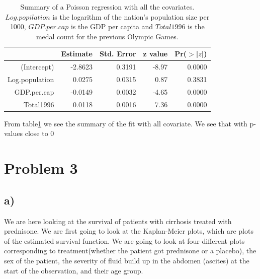 \documentclass[a4paper,norsk, 10pt]{article}
\begin{document}
\begin{table}[!htb]
\centering
\begin{tabular}{rrrrr}
  \hline
 & Estimate & Std. Error & z value & Pr($>$|$z$|) \\ 
  \hline
(Intercept) & -2.8623 & 0.3191 & -8.97 & 0.0000 \\ 
  Log.population & 0.0275 & 0.0315 & 0.87 & 0.3831 \\ 
  GDP.per.cap & -0.0149 & 0.0032 & -4.65 & 0.0000 \\ 
  Total1996 & 0.0118 & 0.0016 & 7.36 & 0.0000 \\ 
   \hline
\end{tabular}
\caption{Summary of a Poisson regression with all the covariates. $Log.popilation$ is the logarithm of the nation's population size per 1000, $GDP.per.cap$ is the GDP per capita and $Total1996$ is the medal count for the previous Olympic Games.}\label{tab:ol_full_it}
\end{table}


From table\ref{tab:ol_full_it} we see the summary of the fit with all covariate. We see that with p-values close to $0$




\section{Problem 3}

\subsection{a)}
We are here looking at the survival of patients with cirrhosis treated with prednisone. We are first going to look at the Kaplan-Meier plots, which are plots of the estimated survival function. We are going to look at four different plots corresponding to treatment(whether the patient got prednisone or a placebo), the sex of the patient, the severity of fluid build up in the abdomen (ascites) at the start of the observation, and their age group.
\end{document}
